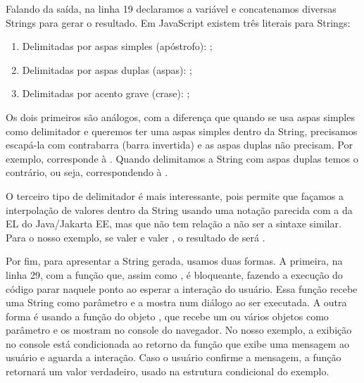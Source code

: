 Falando da saída, na linha 19 declaramos a variável  e concatenamos diversas Strings para gerar o resultado. Em JavaScript existem três literais para Strings:
  
\begin{enumerate}
    \item Delimitadas por aspas simples (apóstrofo): ;
    \item Delimitadas por aspas duplas (aspas): ;
    \item Delimitadas por acento grave (crase): ;
\end{enumerate}

Os dois primeiros são análogos, com a diferença que quando se usa aspas simples como delimitador e queremos ter uma aspas simples dentro da String, precisamos escapá-la com contrabarra (barra invertida) e as aspas duplas não precisam. Por exemplo,  corresponde à . Quando delimitamos a String com aspas duplas temos o contrário, ou seja,  correspondendo à .

O terceiro tipo de delimitador é mais interessante, pois permite que façamos a interpolação de valores dentro da String usando uma notação parecida com a da EL do Java/Jakarta EE, mas que não tem relação a não ser a sintaxe similar. Para o nosso exemplo, se  valer  e  valer , o resultado de  será .

Por fim, para apresentar a String gerada, usamos duas formas. A primeira, na linha 29, com a função  que, assim como , é bloqueante, fazendo a execução do código parar naquele ponto ao esperar a interação do usuário. Essa função recebe uma String como parâmetro e a mostra num diálogo ao ser executada. A outra forma é usando a função  do objeto , que recebe um ou vários objetos como parâmetro e os mostram no console do navegador. No nosso exemplo, a exibição no console está condicionada ao retorno da função  que exibe uma mensagem ao usuário e aguarda a interação. Caso o usuário confirme a mensagem, a função retornará um valor verdadeiro, usado na estrutura condicional  do exemplo.



